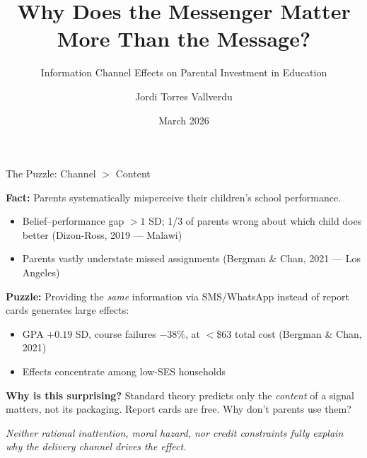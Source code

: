 \documentclass[11pt]{beamer}
\title{Why Does the Messenger Matter More Than the Message?}
\subtitle{Information Channel Effects on Parental Investment in Education}
\author{Jordi Torres Vallverdu}
\institute{MRes TSE --- Behavioral Development Economics}
\date{March 2026}
\begin{document}
\begin{frame}
\titlepage
\end{frame}

\begin{frame}{The Puzzle: Channel $>$ Content}

\textbf{Fact:} Parents systematically misperceive their children's school performance.
\begin{itemize}
    \item Belief--performance gap $>1$ SD; 1/3 of parents wrong about which child does better (Dizon-Ross, 2019 --- Malawi)
    \item Parents vastly understate missed assignments (Bergman \& Chan, 2021 --- Los Angeles)
\end{itemize}

\vspace{0.3cm}
\textbf{Puzzle:} Providing the \emph{same} information via SMS/WhatsApp instead of report cards generates large effects:
\begin{itemize}
    \item GPA $+0.19$ SD, course failures $-38\%$, at $<$\$63 total cost (Bergman \& Chan, 2021)
    \item Effects concentrate among low-SES households
\end{itemize}

\vspace{0.3cm}
\textbf{Why is this surprising?} Standard theory predicts only the \emph{content} of a signal matters, not its packaging. Report cards are free. Why don't parents use them?

{\small \textit{Neither rational inattention, moral hazard, nor credit constraints fully explain why the delivery channel drives the effect.}}

\end{frame}
\end{document}
